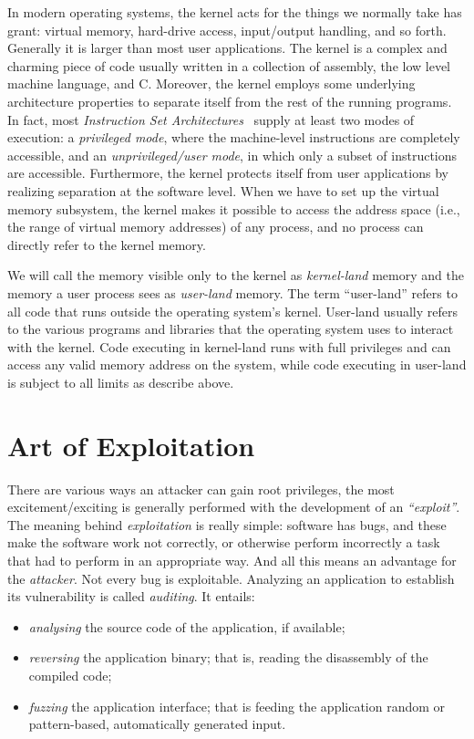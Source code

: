 \documentclass{masterthesis}
\begin{document}
In modern operating systems, the kernel acts for the things we normally take has grant: virtual memory, hard-drive access, input/output handling, and so forth. Generally it is larger than most user applications. The kernel is a complex and charming piece of code usually written in a collection of assembly, the low level machine language, and C.
Moreover, the kernel employs some underlying architecture properties to separate itself from the rest of the running programs.
In fact, most \emph{Instruction Set Architectures}~\cite{silberman1993architectural} supply at least two modes of execution: a \emph{privileged mode}, where the machine-level instructions are completely accessible, and an \emph{unprivileged/user mode}, in which only a subset of instructions are accessible.
Furthermore, the kernel protects itself from user applications by realizing separation at the software level.
When we have to set up the virtual memory subsystem, the kernel makes it possible to access the address space (i.e., the range of virtual memory addresses) of any process, and no process can directly refer to the kernel memory.
 
We will call the memory visible only to the kernel as \emph{kernel-land} memory and the memory a user process sees as \emph{user-land} memory. The term ``user-land'' refers to all code that runs outside the operating system's kernel. User-land usually refers to the various programs and libraries that the operating system uses to interact with the kernel.
Code executing in kernel-land runs with full privileges and can access any valid memory address on the system, while code executing in user-land is subject to all limits as describe above.


\section{Art of Exploitation}
\label{sect:exploitation}

There are various ways an attacker can gain root privileges, the most excitement/exciting is generally performed with the development of an \emph{``exploit''}.
The meaning behind \emph{exploitation} is really simple: software has bugs, and these make the software work not correctly, or otherwise perform incorrectly a task that had to perform in an appropriate way.
And all this means an advantage for the \emph{attacker}. Not every bug is exploitable.
Analyzing an application to establish its vulnerability is called \emph{auditing}. It entails:
\begin{itemize}
\item \emph{analysing} the source code of the application, if available;
\item \emph{reversing} the application binary; that is, reading the disassembly of the compiled code;
\item \emph{fuzzing} the application interface; that is feeding the application random or pattern-based, automatically generated input.
\end{itemize}
\end{document}
